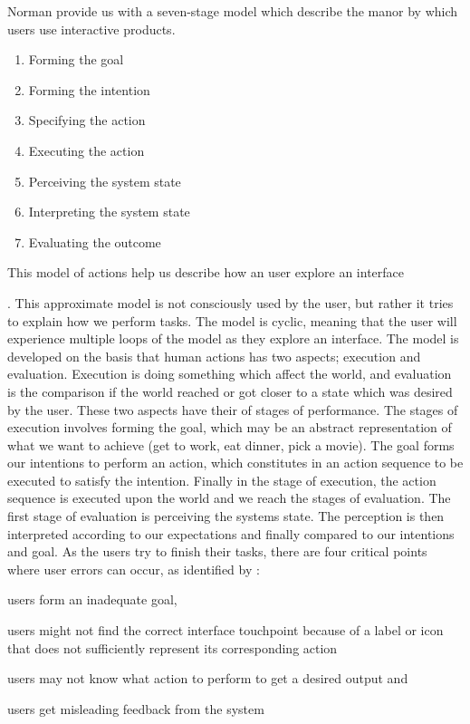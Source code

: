 Norman \cite{Norman2013a} provide us with a seven-stage model which describe the manor by which users use interactive products.
\begin{enumerate}
  \item Forming the goal
  \item Forming the intention
  \item Specifying the action
  \item Executing the action
  \item Perceiving the system state
  \item Interpreting the system state
  \item Evaluating the outcome
\end{enumerate}

This model of actions help us describe how an user explore an interface \cite{}. This approximate model \cite{Norman2013a} is not consciously used by the user, but rather it tries to explain how we perform tasks. The model is cyclic, meaning that the user will experience multiple loops of the model as they explore an interface. The model is developed on the basis that human actions has two aspects; execution and evaluation. Execution is doing something which affect the world, and evaluation is the comparison if the world reached or got closer to a state which was desired by the user. These two aspects have their of stages of performance. The stages of execution involves forming the goal, which may be an abstract representation of what we want to achieve (get to work, eat dinner, pick a movie). The goal forms our intentions to perform an action, which constitutes in an action sequence to be executed to satisfy the intention. Finally in the stage of execution, the action sequence is executed upon the world and we reach the stages of evaluation. The first stage of evaluation is perceiving the systems state. The perception is then interpreted according to our expectations and finally compared to our intentions and goal. As the users try to finish their tasks, there are four critical points where user errors can occur, as identified by \cite{Shneiderman2004}:
\begin{enumerate*}
  \item users form an inadequate goal,
  \item users might not find the correct interface touchpoint because of a label or icon that does not sufficiently represent its corresponding action
  \item users may not know what action to perform to get a desired output and
  \item users get misleading feedback from the system
\end{enumerate*}

